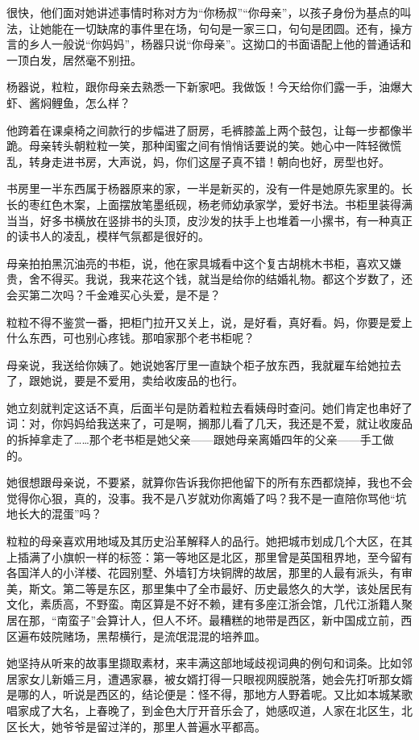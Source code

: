 \documentclass[lang=cn,newtx,12pt,scheme=chinese]{elegantbook}
\begin{document}
很快，他们面对她讲述事情时称对方为“你杨叔”“你母亲”，以孩子身份为基点的叫法，让她能在一切缺席的事件里在场，句句是一家三口，句句是团圆。还有，操方言的乡人一般说“你妈妈”，杨器只说“你母亲”。这拗口的书面语配上他的普通话和一顶白发，居然毫不别扭。

杨器说，粒粒，跟你母亲去熟悉一下新家吧。我做饭！今天给你们露一手，油爆大虾、酱焖鲤鱼，怎么样？

他跨着在课桌椅之间款行的步幅进了厨房，毛裤膝盖上两个鼓包，让每一步都像半跪。母亲转头朝粒粒一笑，那种闺蜜之间有悄悄话要说的笑。她心中一阵轻微慌乱，转身走进书房，大声说，妈，你们这屋子真不错！朝向也好，房型也好。

书房里一半东西属于杨器原来的家，一半是新买的，没有一件是她原先家里的。长长的枣红色木案，上面摆放笔墨纸砚，杨老师幼承家学，爱好书法。书柜里装得满当当，好多书横放在竖排书的头顶，皮沙发的扶手上也堆着一小摞书，有一种真正的读书人的凌乱，模样气氛都是很好的。

母亲拍拍黑沉油亮的书柜，说，他在家具城看中这个复古胡桃木书柜，喜欢又嫌贵，舍不得买。我说，我来花这个钱，就当是给你的结婚礼物。都这个岁数了，还会买第二次吗？千金难买心头爱，是不是？

粒粒不得不鉴赏一番，把柜门拉开又关上，说，是好看，真好看。妈，你要是爱上什么东西，可也别心疼钱。那咱家那个老书柜呢？

母亲说，我送给你姨了。她说她客厅里一直缺个柜子放东西，我就雇车给她拉去了，跟她说，要是不爱用，卖给收废品的也行。

她立刻就判定这话不真，后面半句是防着粒粒去看姨母时查问。她们肯定也串好了词：对，你妈妈给我送来了，可是啊，搁那儿看了几天，我还是不爱，就让收废品的拆掉拿走了……那个老书柜是她父亲——跟她母亲离婚四年的父亲——手工做的。

她很想跟母亲说，不要紧，就算你告诉我你把他留下的所有东西都烧掉，我也不会觉得你心狠，真的，没事。我不是八岁就劝你离婚了吗？我不是一直陪你骂他“坑地长大的混蛋”吗？

粒粒的母亲喜欢用地域及其历史沿革解释人的品行。她把城市划成几个大区，在其上插满了小旗帜一样的标签：第一等地区是北区，那里曾是英国租界地，至今留有各国洋人的小洋楼、花园别墅、外墙钉方块铜牌的故居，那里的人最有派头，有审美，斯文。第二等是东区，那里集中了全市最好、历史最悠久的大学，该处居民有文化，素质高，不野蛮。南区算是不好不赖，建有多座江浙会馆，几代江浙籍人聚居在那，“南蛮子”会算计人，但人不坏。最糟糕的地带是西区，新中国成立前，西区遍布妓院赌场，黑帮横行，是流氓混混的培养皿。

她坚持从听来的故事里撷取素材，来丰满这部地域歧视词典的例句和词条。比如邻居家女儿新婚三月，遭遇家暴，被女婿打得一只眼视网膜脱落，她会先打听那女婿是哪的人，听说是西区的，结论便是：怪不得，那地方人野着呢。又比如本城某歌唱家成了大名，上春晚了，到金色大厅开音乐会了，她感叹道，人家在北区生，北区长大，她爷爷是留过洋的，那里人普遍水平都高。
\end{document}

